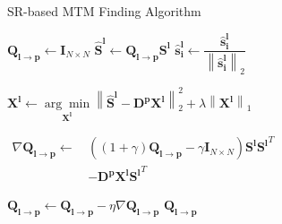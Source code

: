 \documentclass[journal,transmag]{IEEEtran}
\begin{document}
\begin{algorithm}
\caption{SR-based MTM Finding Algorithm}
\begin{algorithmic}[1]

    \State $\bm{Q_{l \rightarrow p}} \gets \bm{I}_{N \times N}$
        \State $\bm{\widehat{S}^l} \gets \bm{Q_{l \rightarrow p}} \bm{S^l}$ 
        \State $\bm{\widehat{s}_i^l} \gets \dfrac{\bm{\widehat{s}_i^l}}{ \left\| \bm{\widehat{s}_i^l} \right\|_2}$ 




        
\State $\bm{X^l} \gets \underset{\bm{X^l}}{\arg\min} \left\| \bm{\widehat{S}^l} - \bm{D^p} \bm{X^l} \right\|_2^2 + \lambda \left\| \bm{X^l} \right\|_1$
        


\State $\begin{aligned} \nabla \bm{Q_{l \rightarrow p}} \gets \, &\left(\left(1 + \gamma\right)\bm{Q_{l \rightarrow p}} - \gamma \bm{I}_{N \times N}\right)\bm{S^l} {\bm{S^l}}^T \\ &- \bm{D^p X^l} {\bm{S^l}}^T \end{aligned}$
        
        \State $\bm{Q_{l \rightarrow p}} \gets \bm{Q_{l \rightarrow p}} - \eta \nabla \bm{Q_{l \rightarrow p}}$
    \EndFor
    \State \Return $\bm{Q_{l \rightarrow p}}$
\EndProcedure

\end{algorithmic}
\label{alg:mtm_algorithm}
\end{algorithm}
\end{document}
